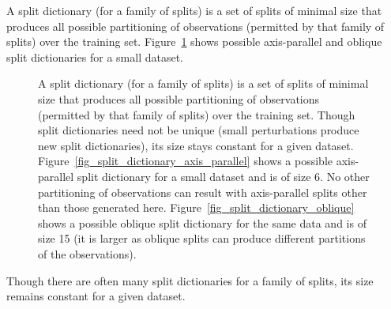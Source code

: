 A split dictionary (for a family of splits) is a set of splits of minimal size that produces all possible partitioning of observations (permitted by that family of splits) over the training set. Figure~\ref{fig_split_dictionaries} shows possible axis-parallel and oblique split dictionaries for a small dataset.
\begin{figure}
\centering
{}
\caption{
A split dictionary (for a family of splits) is a set of splits of minimal size that produces all possible partitioning of observations (permitted by that family of splits) over the training set. Though split dictionaries need not be unique (small perturbations produce new split dictionaries), its size stays constant for a given dataset. Figure~\ref{fig_split_dictionary_axis_parallel} shows a possible axis-parallel split dictionary for a small dataset and is of size 6. No other partitioning of observations can result with axis-parallel splits other than those generated here. Figure~\ref{fig_split_dictionary_oblique} shows a possible oblique split dictionary for the same data and is of size 15 (it is larger as oblique splits can produce different partitions of the observations).}
\label{fig_split_dictionaries}
\end{figure}
Though there are often many split dictionaries for a family of splits, its size remains constant for a given dataset.\\


